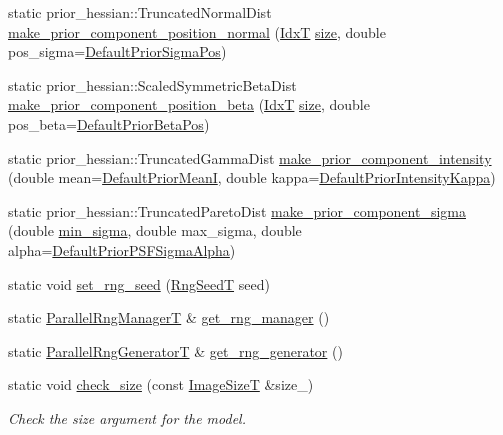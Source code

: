 \begin{DoxyCompactItemize}
\item 
static prior\+\_\+hessian\+::\+Truncated\+Normal\+Dist \hyperlink{classmappel_1_1PointEmitterModel_a70b1a5c81d227dce0ffb5910ffbf7387}{make\+\_\+prior\+\_\+component\+\_\+position\+\_\+normal} (\hyperlink{namespacemappel_ab17ec0f30b61ece292439d7ece81d3a8}{IdxT} \hyperlink{classmappel_1_1ImageFormat2DBase_a3be77d2aa6ec9f3815322732950c2a60}{size}, double pos\+\_\+sigma=\hyperlink{classmappel_1_1PointEmitterModel_a38b73a91eaae7b5fd0977b88ea844280}{Default\+Prior\+Sigma\+Pos})
\item 
static prior\+\_\+hessian\+::\+Scaled\+Symmetric\+Beta\+Dist \hyperlink{classmappel_1_1PointEmitterModel_a1f6f12bdf0e6fc374bf217172fc0ccef}{make\+\_\+prior\+\_\+component\+\_\+position\+\_\+beta} (\hyperlink{namespacemappel_ab17ec0f30b61ece292439d7ece81d3a8}{IdxT} \hyperlink{classmappel_1_1ImageFormat2DBase_a3be77d2aa6ec9f3815322732950c2a60}{size}, double pos\+\_\+beta=\hyperlink{classmappel_1_1PointEmitterModel_a2771dc4415f351862619cd9671b5310d}{Default\+Prior\+Beta\+Pos})
\item 
static prior\+\_\+hessian\+::\+Truncated\+Gamma\+Dist \hyperlink{classmappel_1_1PointEmitterModel_a41deeb728d8fae68ca474e97ea73d429}{make\+\_\+prior\+\_\+component\+\_\+intensity} (double mean=\hyperlink{classmappel_1_1PointEmitterModel_a607fcdea787b0cc3c6ac8804d378d1b1}{Default\+Prior\+MeanI}, double kappa=\hyperlink{classmappel_1_1PointEmitterModel_a03d9f90c130df2d42d0d31c9337e914c}{Default\+Prior\+Intensity\+Kappa})
\item 
static prior\+\_\+hessian\+::\+Truncated\+Pareto\+Dist \hyperlink{classmappel_1_1PointEmitterModel_a7506af8d9e430e63a56972eb64709fca}{make\+\_\+prior\+\_\+component\+\_\+sigma} (double \hyperlink{classmappel_1_1Gauss2DsModel_a8a97d37d210c1d161e4bc32c3a7b20dc}{min\+\_\+sigma}, double max\+\_\+sigma, double alpha=\hyperlink{classmappel_1_1PointEmitterModel_a2b06111eaa1ff284851c2e67a3827220}{Default\+Prior\+P\+S\+F\+Sigma\+Alpha})
\item 
static void \hyperlink{classmappel_1_1PointEmitterModel_a046d5bd901c8dfde61f082c2634beec0}{set\+\_\+rng\+\_\+seed} (\hyperlink{namespacemappel_a318bca259a7add5979160939a3f4e60b}{Rng\+SeedT} seed)
\item 
static \hyperlink{namespacemappel_acf276a4212f07b1ed4cb2ddce379ba1d}{Parallel\+Rng\+ManagerT} \& \hyperlink{classmappel_1_1PointEmitterModel_ae876f0fa81613161a064452973bfb558}{get\+\_\+rng\+\_\+manager} ()
\item 
static \hyperlink{namespacemappel_ad1e99b214465229065d30f881a89d1cc}{Parallel\+Rng\+GeneratorT} \& \hyperlink{classmappel_1_1PointEmitterModel_af9f6630e9d496bb83e151f00522ecc2d}{get\+\_\+rng\+\_\+generator} ()
\item 
static void \hyperlink{classmappel_1_1ImageFormat2DBase_a9c90f6a165348629be4bcf956e3010f3}{check\+\_\+size} (const \hyperlink{classmappel_1_1ImageFormat2DBase_a49cccf61eb2a768a202634d27fcd81d5}{Image\+SizeT} \&size\+\_\+)
\begin{DoxyCompactList}\small\item\em Check the size argument for the model. \end{DoxyCompactList}\end{DoxyCompactItemize}
